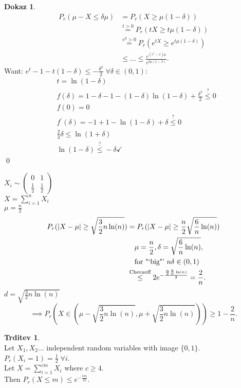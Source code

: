 \documentclass[a4paper, 12pt]{book}
\theoremstyle{definition}
\newtheorem{claim}[counter]{Trditev}
\newtheorem{pro}[counter]{Dokaz}
\theoremstyle{remark}
\begin{document}
\begin{pro}
  \begin{align*}
    P_r(\mu - X \leq \delta \mu) &= P_r(X \geq \mu(1-\delta)) \\
    &\stackrel{t>0}{=} P_r(tX \geq t\mu(1-\delta)) \\
    &\stackrel{e^y>0}{=} P_r(e^{tX} \geq e^{t\mu(1-\delta)}) \\
    &\leq \dots \leq \frac{e^{(e^t-1)\mu}}{e^{t\mu(1-\delta)}}.
  \end{align*}
  Want: $e^t - 1 - t(1-\delta) \leq -\frac{\delta^2}{2} \; \forall \delta \in (0,1)$:
  \begin{align*}
    &t = \ln(1-\delta) \\
    &f(\delta) = 1 - \delta - 1 - (1-\delta) \ln(1-\delta) + \frac{\delta^2}{2} \stackrel{?}{\leq} 0 \\
    &f(0) = 0 \\
    &f^{'}(\delta) = - 1 + 1 - \ln(1-\delta) + \delta \stackrel{?}{\leq} 0 \\
    &\frac{2}{3} \delta \leq \ln(1+\delta) \\
    &\ln(1-\delta) \stackrel{?}{\leq} -\delta \checkmark
  \end{align*}
  \qed
\end{pro}
$X_i \sim \begin{pmatrix}0 & 1 \\ \frac{1}{2} & \frac{1}{2}\end{pmatrix}$ \\
$X = \sum_{i=1}^{n} X_i$ \\
$\mu = \frac{n}{2}$
\begin{align*}
  P_r(|X-\mu| \geq \sqrt{\frac{3}{2}n \ln(n)}) &= P_r(|X-\mu| \geq \frac{n}{2} \sqrt{\frac{6}{n} \ln(n)}) \\
  &\quad \mu = \frac{n}{2}, \delta = \sqrt{\frac{6}{n} \ln(n)}, \\
  &\quad \text{for "`big"' }n \delta \in (0,1) \\
  &\stackrel{\text{Chernoff}}{\leq} 2 e^{-\frac{\frac{n}{2} \frac{6}{n} \ln(n)}{3}} = \frac{2}{n}.
\end{align*}
$d = \sqrt{\frac{3}{2}n \ln(n)}$
\begin{equation*}
  \implies P_r(X \in (\mu - \sqrt{\frac{3}{2}n \ln(n)}, \mu + \sqrt{\frac{3}{2}n \ln(n)})) \geq 1 - \frac{2}{n}.
\end{equation*}
\begin{claim} \text{} \\
  Let $X_1, X_2 \dots$ independent random variables with image $\{0,1\}$. \\
  $P_r(X_i = 1) = \frac{1}{2} \; \forall i$. \\
  Let $X = \sum_{i=1}^{cm} X_i$ where $c \geq 4$. \\
  Then $P_r(X \leq m) \leq e^{-\frac{cm}{16}}$.
\end{claim}
\end{document}
